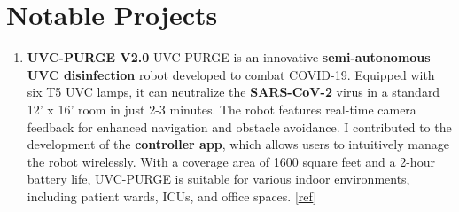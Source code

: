 \section{Notable Projects}
\begin{enumerate}





\item {\textbf{UVC-PURGE V2.0}  \newline
UVC-PURGE is an innovative \textbf{semi-autonomous UVC disinfection} robot developed to combat COVID-19. Equipped with six T5 UVC lamps, it can neutralize the \textbf{SARS-CoV-2} virus in a standard 12' x 16' room in just 2-3 minutes. The robot features real-time camera feedback for enhanced navigation and obstacle avoidance. I contributed to the development of the \textbf{controller app}, which allows users to intuitively manage the robot wirelessly. With a coverage area of 1600 square feet and a 2-hour battery life, UVC-PURGE is suitable for various indoor environments, including patient wards, ICUs, and office spaces.
[\href{https://mist.ac.bd/blog/cse/post/uvc_purge_v20-146}{\underline{ref}}]}




\end{enumerate}
